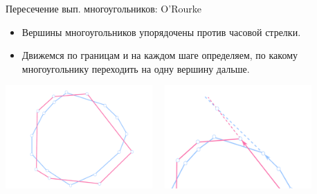     \begin{frame}{Пересечение вып. многоугольников: O'Rourke}

        \begin{itemize}

            \item Вершины многоугольников упорядочены против часовой стрелки.

            \item Движемся по границам и на каждом шаге определяем, по какому многоугольнику переходить на одну вершину дальше.

        \end{itemize}

        \begin{center}
        \includegraphics[width=0.42\textwidth]{картинки/пересечение_мн-в.pdf}
        \ \ 
        \includegraphics[width=0.42\textwidth]{картинки/крупное_пересечение_мн-в.pdf}
        \end{center}

    \end{frame}


